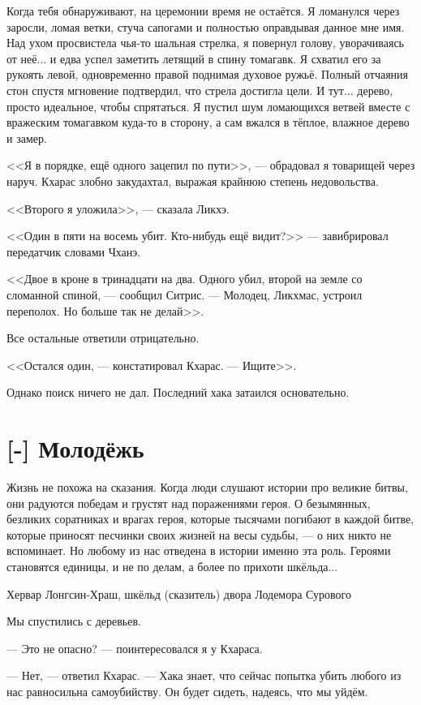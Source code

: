 Когда тебя обнаруживают, на церемонии время не остаётся.
Я ломанулся через заросли, ломая ветки, стуча сапогами и полностью оправдывая данное мне имя.
Над ухом просвистела чья-то шальная стрелка, я повернул голову, уворачиваясь от неё... и едва успел заметить летящий в спину томагавк.
Я схватил его за рукоять левой, одновременно правой поднимая духовое ружьё.
Полный отчаяния стон спустя мгновение подтвердил, что стрела достигла цели.
И тут... дерево, просто идеальное, чтобы спрятаться.
Я пустил шум ломающихся ветвей вместе с вражеским томагавком куда-то в сторону, а сам вжался в тёплое, влажное дерево и замер.

<<Я в порядке, ещё одного зацепил по пути>>, --- обрадовал я товарищей через наруч.
Кхарас злобно закудахтал, выражая крайнюю степень недовольства.

<<Второго я уложила>>, --- сказала Ликхэ.

<<Один в пяти на восемь убит.
Кто-нибудь ещё видит?>> --- завибрировал передатчик словами Чханэ.

<<Двое в кроне в тринадцати на два.
Одного убил, второй на земле со сломанной спиной, --- сообщил Ситрис.
--- Молодец, Ликхмас, устроил переполох.
Но больше так не делай>>.

Все остальные ответили отрицательно.

<<Остался один, --- констатировал Кхарас.
--- Ищите>>.

Однако поиск ничего не дал.
Последний хака затаился основательно.

\section{[-] Молодёжь}

\epigraph
{Жизнь не похожа на сказания.
Когда люди слушают истории про великие битвы, они радуются победам и грустят над поражениями героя.
О безымянных, безликих соратниках и врагах героя, которые тысячами погибают в каждой битве, которые приносят песчинки своих жизней на весы судьбы, --- о них никто не вспоминает.
Но любому из нас отведена в истории именно эта роль.
Героями становятся единицы, и не по делам, а более по прихоти шкёльда...}
{Хервар Лонгсин-Храш, шкёльд (сказитель) двора Лодемора Сурового}

Мы спустились с деревьев.

--- Это не опасно? --- поинтересовался я у Кхараса.

--- Нет, --- ответил Кхарас.
--- Хака знает, что сейчас попытка убить любого из нас равносильна самоубийству.
Он будет сидеть, надеясь, что мы уйдём.

